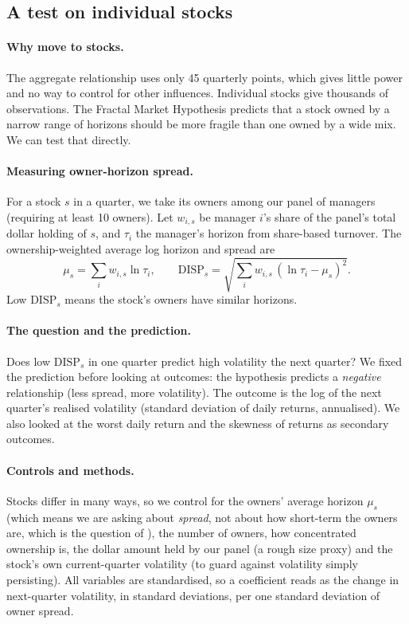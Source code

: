 \subsection{A test on individual stocks}
\label{sec:stock}

\paragraph{Why move to stocks.} The aggregate relationship uses only 45 quarterly points, which gives little power and no way to control for other influences. Individual stocks give thousands of observations. The Fractal Market Hypothesis predicts that a stock owned by a narrow range of horizons should be more fragile than one owned by a wide mix. We can test that directly.

\paragraph{Measuring owner-horizon spread.} For a stock $s$ in a quarter, we take its owners among our panel of managers (requiring at least 10 owners). Let $w_{i,s}$ be manager $i$'s share of the panel's total dollar holding of $s$, and $\tau_i$ the manager's horizon from share-based turnover. The ownership-weighted average log horizon and spread are
\begin{equation}
\mu_s=\sum_i w_{i,s}\ln\tau_i,\qquad
\mathrm{DISP}_s=\sqrt{\sum_i w_{i,s}\,(\ln\tau_i-\mu_s)^2}.
\label{eq:disp}
\end{equation}
Low $\mathrm{DISP}_s$ means the stock's owners have similar horizons.

\paragraph{The question and the prediction.} Does low $\mathrm{DISP}_s$ in one quarter predict high volatility the next quarter? We fixed the prediction before looking at outcomes: the hypothesis predicts a \emph{negative} relationship (less spread, more volatility). The outcome is the log of the next quarter's realised volatility (standard deviation of daily returns, annualised). We also looked at the worst daily return and the skewness of returns as secondary outcomes.

\paragraph{Controls and methods.} Stocks differ in many ways, so we control for the owners' average horizon $\mu_s$ (which means we are asking about \emph{spread}, not about how short-term the owners are, which is the question of \citealt{cella2013}), the number of owners, how concentrated ownership is, the dollar amount held by our panel (a rough size proxy) and the stock's own current-quarter volatility (to guard against volatility simply persisting). All variables are standardised, so a coefficient reads as the change in next-quarter volatility, in standard deviations, per one standard deviation of owner spread.

